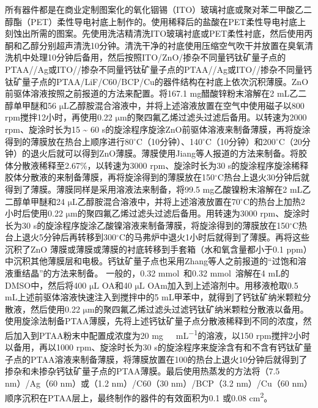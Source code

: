 \documentclass[forlib]{WHUMaster}   %
\begin{document}
{所有器件都是在商业定制图案化的氧化铟锡（ITO）玻璃衬底或聚对苯二甲酸乙二醇酯（PET）柔性导电衬底上制作的。使用稀释后的盐酸在PET柔性导电衬底上刻蚀出所需的图案。先使用洗洁精清洗ITO玻璃衬底或PET柔性衬底，然后使用丙酮和乙醇分别超声清洗10分钟。清洗干净的衬底使用压缩空气吹干并放置在臭氧清洗机中处理10分钟后备用，然后按照ITO/ZnO/掺杂不同量钙钛矿量子点的PTAA//Ag或ITO//掺杂不同量钙钛矿量子点的PTAA//Ag或ITO//掺杂不同量钙钛矿量子点的PTAA/LiF/C60/BCP/Cu的器件结构在衬底上依次沉积薄膜。ZnO前驱体溶液按照之前报道的方法来配置\cite{RN1}。将167.1 mg醋酸锌粉末溶解在2 mL乙二醇单甲醚和56 $\si{\uL}$乙醇胺混合溶液中，并将上述溶液放置在空气中使用磁子以800 rpm搅拌12小时，再使用0.22 $\si{\um}$的聚四氟乙烯过滤头过滤后备用。以转速为2000 rpm、旋涂时长为15 \~{} 60 s的旋涂程序旋涂ZnO前驱体溶液来制备薄膜，再将旋涂得到的薄膜放在热台上顺序进行80$^{\circ}$C（10分钟）、140$^{\circ}$C（10分钟）和200$^{\circ}$C（20分钟）的退火后就可以得到ZnO薄膜。薄膜使用Jiang等人报道的方法来制备\cite{RN111}。将胶体分散液稀释至2.67\%，以转速为3000 rpm、旋涂时长为30 s的旋涂程序旋涂稀释胶体分散液的来制备薄膜，再将旋涂得到的薄膜放在150$^{\circ}$C热台上退火30分钟后就得到了薄膜。薄膜同样是采用溶液法来制备，将99.5 mg乙酸镍粉末溶解在2 mL乙二醇单甲醚和24 $\si{\uL}$乙醇胺混合溶液中，并将上述溶液放置在70$^{\circ}$C的热台上加热2小时后使用0.22 $\si{\um}$的聚四氟乙烯过滤头过滤后备用。用转速为3000 rpm、旋涂时长为30 s的旋涂程序旋涂乙酸镍溶液来制备薄膜，将旋涂得到的薄膜放在150$^{\circ}$C热台上退火5分钟后再转移到300$^{\circ}$C的马弗炉中退火1小时后就得到了薄膜。再将这些沉积了ZnO 薄膜或薄膜或薄膜的衬底转移到手套箱（水和氧含量都小于0.1 ppm）中沉积其他薄膜层和电极。钙钛矿量子点也采用Zhang等人之前报道的“过饱和溶液重结晶”的方法来制备\cite{RN10}。 一般的，0.32 mmol\ 和0.32 mmol\ 溶解在4 mL的DMSO中，然后将400 $\si{\uL}$ OA和40 $\si{\uL}$ OAm加入到上述溶剂中。用移液枪取0.5 mL上述前驱体溶液快速注入到搅拌中的5 mL甲苯中，就得到了钙钛矿纳米颗粒分散液，然后使用0.22 $\si{\um}$的聚四氟乙烯过滤头过滤钙钛矿纳米颗粒分散液以备用。使用旋涂法制备PTAA薄膜，先将上述钙钛矿量子点分散液稀释到不同的浓度，然后加入到PTAA粉末中配置成浓度为20 \si{mg\ mL^{-1}}的溶液，以150 rpm搅拌2小时以备用，再以1000 rpm、旋涂时长为30 s的旋涂程序来旋涂含有和不含有钙钛矿量子点的PTAA溶液来制备薄膜，将薄膜放置在100\textcelsius 的热台上退火10分钟后就得到了掺杂和未掺杂钙钛矿量子点的PTAA薄膜。最后使用热蒸发的方法将（7.5 nm）/Ag（60 nm）或（1.2 nm）/C60（30 nm）/BCP（3.2 nm）/Cu（60 nm）顺序沉积在PTAA层上，最终制作的器件的有效面积为0.1 或0.08 \si{cm^2}。

}
\end{document}
